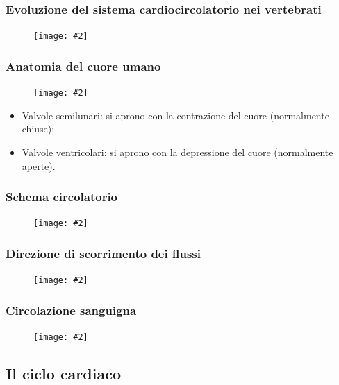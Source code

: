 \documentclass{article}
\newcommand{\cfig}[2]{
    \phantom{}
    \begin{figure}[ht!]
        \begin{center}
            \texttt{[image: \#2]}
        \end{center}
    \end{figure}
}
\begin{document}
\subsubsection{Evoluzione del sistema cardiocircolatorio nei vertebrati}
\cfig{.8}{media/evoluzione-cuore.png}

\subsubsection{Anatomia del cuore umano}
\cfig{.9}{media/anatomia-cuore.png}

\begin{itemize}
    \item Valvole semilunari: si aprono con la contrazione del cuore (normalmente chiuse);
    \item Valvole ventricolari: si aprono con la depressione del cuore (normalmente aperte).
\end{itemize}

\subsubsection{Schema circolatorio}

\cfig{.6}{media/schema-cuore.png}

\subsubsection{Direzione di scorrimento dei flussi}
\cfig{.5}{media/circ-cuore.png}

\newpage
\subsubsection{Circolazione sanguigna}
\cfig{1}{media/circ-sanguigna.png}

\subsection{Il ciclo cardiaco}
\end{document}
